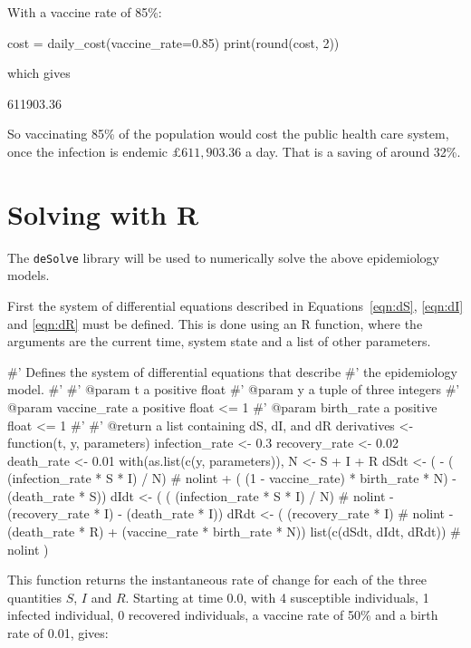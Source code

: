 With a vaccine rate of 85\%:

\begin{pyin}
cost = daily_cost(vaccine_rate=0.85)
print(round(cost, 2))
\end{pyin}

which gives

\begin{pyout}
611903.36
\end{pyout}

So vaccinating 85\% of the population would cost the public health care system,
once the infection is endemic $\pounds 611,903.36$ a day. That is a saving of
around 32\%.


\section{Solving with R}\label{sec:solving-with-R}

The \texttt{deSolve} library will be used to numerically solve the above
epidemiology models.

First the system of differential equations described in Equations~\ref{eqn:dS},
\ref{eqn:dI} and \ref{eqn:dR} must be defined. This is done using an R function,
where the arguments are the current time, system state and a list of other
parameters.

\begin{Rin}
#' Defines the system of differential equations that describe
#' the epidemiology model.
#'
#' @param t a positive float
#' @param y a tuple of three integers
#' @param vaccine_rate a positive float <= 1
#' @param birth_rate a positive float <= 1
#'
#' @return a list containing dS, dI, and dR
derivatives <- function(t, y, parameters){
  infection_rate <- 0.3
  recovery_rate <- 0.02
  death_rate <- 0.01
  with(as.list(c(y, parameters)), {
    N <- S + I + R
    dSdt <- ( - ( (infection_rate * S * I) / N)  # nolint
             + ( (1 - vaccine_rate) * birth_rate * N)
             - (death_rate * S))
    dIdt <- ( ( (infection_rate * S * I) / N)  # nolint
            - (recovery_rate * I)
            - (death_rate * I))
    dRdt <- ( (recovery_rate * I)  # nolint
             - (death_rate * R)
             + (vaccine_rate * birth_rate * N))
    list(c(dSdt, dIdt, dRdt))  # nolint
  })
}
\end{Rin}

This function returns the instantaneous rate of change for each of the
three quantities $S$, $I$ and $R$. Starting at time 0.0, with 4 susceptible
individuals, 1 infected individual, 0 recovered individuals, a vaccine rate
of 50\% and a birth rate of 0.01, gives:

